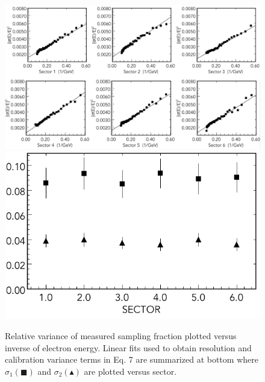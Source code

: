 \begin{figure}[hbt]
\centering
\includegraphics[width=1.0\columnwidth,keepaspectratio]{img/S10_1_1.png}
\includegraphics[width=0.5\columnwidth,keepaspectratio]{img/S10_1_2.png}
\caption[]{Relative variance of measured sampling fraction plotted versus inverse of electron energy.  Linear fits used to obtain resolution and calibration variance terms in Eq. 7 are summarized at bottom where $\sigma_1 (\blacksquare)$ and $\sigma_2 (\blacktriangle)$ are plotted versus sector.}
\label{fig:S10_1_1}
\end{figure}

